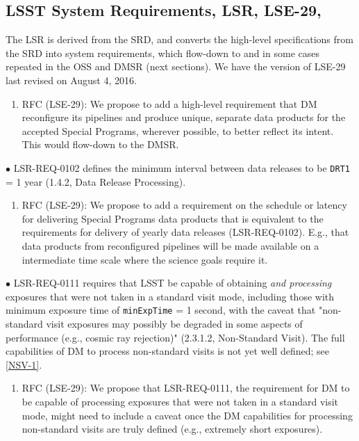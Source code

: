 \documentclass[DM,lsstdraft,toc]{lsstdoc}
\begin{document}
\subsection{LSST System Requirements, LSR, LSE-29, \cite{LSE-29}}\label{ssec:docrev_lsr}

The LSR is derived from the SRD, and converts the high-level specifications from the SRD into system requirements, which flow-down to and in some cases repeated in the OSS and DMSR (next sections). We have the version of LSE-29 last revised on August 4, 2016.

\begin{enumerate}[resume,topsep=-10pt,after=\vspace{10pt},label= \textbf{Action \Roman*}] \item \label{LSR-0} RFC (LSE-29): We propose to add a high-level requirement that DM reconfigure its pipelines and produce unique, separate data products for the accepted Special Programs, wherever possible, to better reflect its intent. This would flow-down to the DMSR. \end{enumerate}

$\bullet$ LSR-REQ-0102 defines the minimum interval between data releases to be {\tt DRT1} = 1 year (1.4.2, Data Release Processing).
\begin{enumerate}[resume,topsep=-10pt,after=\vspace{10pt},label= \textbf{Action \Roman*}] \item \label{LSR-1} RFC (LSE-29): We propose to add a requirement on the schedule or latency for delivering Special Programs data products that is equivalent to the requirements for delivery of yearly data releases (LSR-REQ-0102). E.g., that data products from reconfigured pipelines will be made available on a intermediate time scale where the science goals require it. \end{enumerate}

$\bullet$ LSR-REQ-0111 requires that LSST be capable of obtaining \textit{and processing} exposures that were not taken in a standard visit mode, including those with minimum exposure time of {\tt minExpTime} = 1 second, with the caveat that "non-standard visit exposures may possibly be degraded in some aspects of performance (e.g., cosmic ray rejection)" (2.3.1.2, Non-Standard Visit). The full capabilities of DM to process non-standard visits is not yet well defined; see \ref{NSV-1}.
\begin{enumerate}[resume,topsep=-10pt,after=\vspace{10pt},label= \textbf{Action \Roman*}] \item \label{LSR-2} RFC (LSE-29): We propose that LSR-REQ-0111, the requirement for DM to be capable of processing exposures that were not taken in a standard visit mode, might need to include a caveat once the DM capabilities for processing non-standard visits are truly defined (e.g., extremely short exposures). \end{enumerate}
\end{document}
